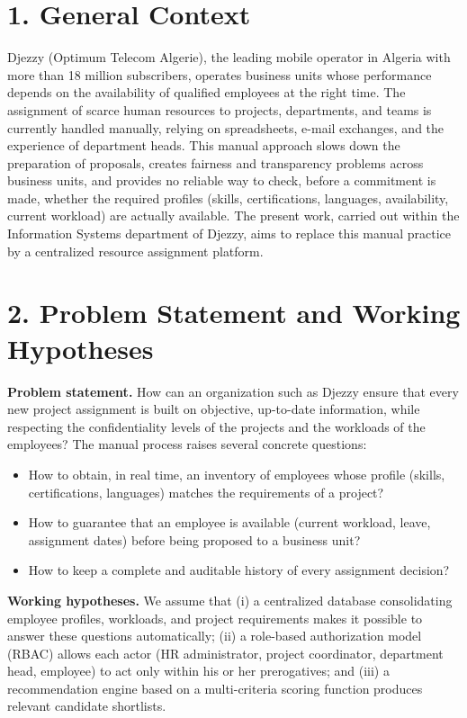 \documentclass{bts-report}
\begin{document}
\section*{1. General Context}
Djezzy (Optimum Telecom Algerie), the leading mobile operator in Algeria with more than 18 million subscribers, operates business units whose performance depends on the availability of qualified employees at the right time. The assignment of scarce human resources to projects, departments, and teams is currently handled manually, relying on spreadsheets, e-mail exchanges, and the experience of department heads. This manual approach slows down the preparation of proposals, creates fairness and transparency problems across business units, and provides no reliable way to check, before a commitment is made, whether the required profiles (skills, certifications, languages, availability, current workload) are actually available. The present work, carried out within the Information Systems department of Djezzy, aims to replace this manual practice by a centralized resource assignment platform.

\section*{2. Problem Statement and Working Hypotheses}
\textbf{Problem statement.} How can an organization such as Djezzy ensure that every new project assignment is built on objective, up-to-date information, while respecting the confidentiality levels of the projects and the workloads of the employees? The manual process raises several concrete questions:
\begin{itemize}
  \item How to obtain, in real time, an inventory of employees whose profile (skills, certifications, languages) matches the requirements of a project?
  \item How to guarantee that an employee is available (current workload, leave, assignment dates) before being proposed to a business unit?
  \item How to keep a complete and auditable history of every assignment decision?
\end{itemize}
\textbf{Working hypotheses.} We assume that (i) a centralized database consolidating employee profiles, workloads, and project requirements makes it possible to answer these questions automatically; (ii) a role-based authorization model (RBAC) allows each actor (HR administrator, project coordinator, department head, employee) to act only within his or her prerogatives; and (iii) a recommendation engine based on a multi-criteria scoring function produces relevant candidate shortlists.
\end{document}
